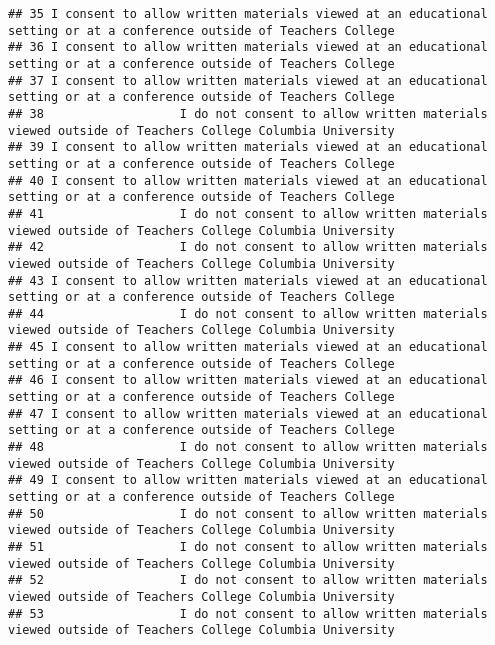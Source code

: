 \documentclass[]{article}
\begin{document}
\begin{verbatim}
## 35 I consent to allow written materials viewed at an educational setting or at a conference outside of Teachers College
## 36 I consent to allow written materials viewed at an educational setting or at a conference outside of Teachers College
## 37 I consent to allow written materials viewed at an educational setting or at a conference outside of Teachers College
## 38                   I do not consent to allow written materials viewed outside of Teachers College Columbia University
## 39 I consent to allow written materials viewed at an educational setting or at a conference outside of Teachers College
## 40 I consent to allow written materials viewed at an educational setting or at a conference outside of Teachers College
## 41                   I do not consent to allow written materials viewed outside of Teachers College Columbia University
## 42                   I do not consent to allow written materials viewed outside of Teachers College Columbia University
## 43 I consent to allow written materials viewed at an educational setting or at a conference outside of Teachers College
## 44                   I do not consent to allow written materials viewed outside of Teachers College Columbia University
## 45 I consent to allow written materials viewed at an educational setting or at a conference outside of Teachers College
## 46 I consent to allow written materials viewed at an educational setting or at a conference outside of Teachers College
## 47 I consent to allow written materials viewed at an educational setting or at a conference outside of Teachers College
## 48                   I do not consent to allow written materials viewed outside of Teachers College Columbia University
## 49 I consent to allow written materials viewed at an educational setting or at a conference outside of Teachers College
## 50                   I do not consent to allow written materials viewed outside of Teachers College Columbia University
## 51                   I do not consent to allow written materials viewed outside of Teachers College Columbia University
## 52                   I do not consent to allow written materials viewed outside of Teachers College Columbia University
## 53                   I do not consent to allow written materials viewed outside of Teachers College Columbia University
\end{verbatim}
\end{document}
